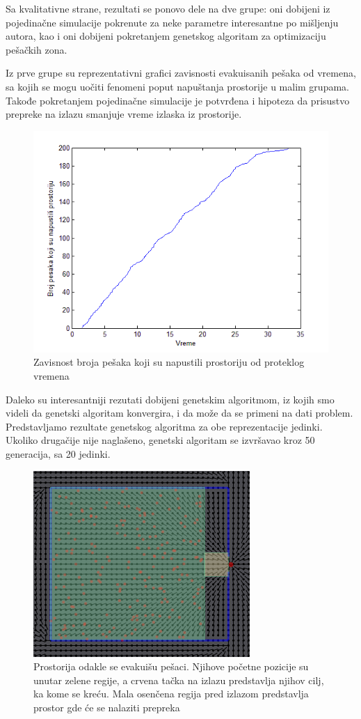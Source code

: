 \documentclass[12pt]{article}
\begin{document}
Sa kvalitativne strane, rezultati se ponovo dele na dve grupe: oni dobijeni iz pojedinačne simulacije pokrenute za neke parametre interesantne po mišljenju autora, kao i oni dobijeni pokretanjem genetskog algoritam za optimizaciju pešačkih zona.

Iz  prve grupe su reprezentativni grafici zavisnosti evakuisanih pešaka od vremena, sa kojih se mogu uočiti fenomeni poput napuštanja prostorije u malim grupama. Takođe pokretanjem pojedinačne simulacije je potvrđena i hipoteza da prisustvo prepreke na izlazu smanjuje vreme izlaska iz prostorije.

\begin{figure}
\centering
\includegraphics[scale=.6]{Vreme.png}
\caption{Zavisnost broja pešaka koji su napustili prostoriju od proteklog vremena}
\end{figure}

Daleko su interesantniji rezutati dobijeni genetskim algoritmom, iz kojih smo videli da genetski algoritam konvergira, i da može da se primeni na dati problem. Predstavljamo rezultate genetskog algoritma za obe reprezentacije jedinki. Ukoliko drugačije nije naglašeno, genetski algoritam se izvršavao kroz 50 generacija, sa 20 jedinki.

\begin{figure}
\centering
\includegraphics{prostorija}
\caption{Prostorija odakle se evakuišu pešaci. Njihove početne pozicije su unutar zelene regije, a crvena tačka na izlazu predstavlja njihov cilj, ka kome se kreću. Mala osenčena regija pred izlazom predstavlja prostor gde će se nalaziti prepreka}
\label{fig:prostorija1}
\end{figure}
\end{document}

